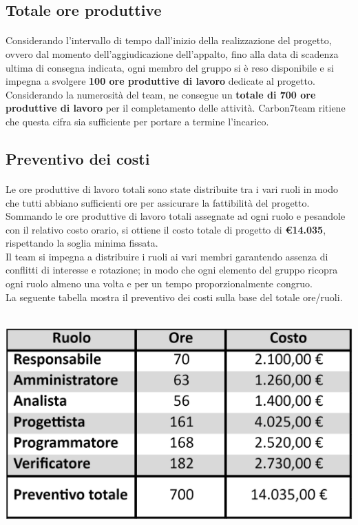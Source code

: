 \subsection{Totale ore produttive}
\paragraph{}
Considerando l’intervallo di tempo dall’inizio della realizzazione del
progetto, ovvero dal momento dell’aggiudicazione dell’appalto, fino alla
data di scadenza ultima di consegna indicata, ogni membro del gruppo si
è reso disponibile e si impegna a svolgere \textbf{100 ore produttive di lavoro}
dedicate al progetto. Considerando la numerosità del team, ne consegue un
\textbf{totale di 700 ore produttive di lavoro} per il completamento delle attività.
Carbon7team ritiene che questa cifra sia sufficiente per portare a termine
l’incarico.
\subsection{Preventivo dei costi}
\paragraph{}
Le ore produttive di lavoro totali sono state distribuite tra i vari ruoli
in modo che tutti abbiano sufficienti ore per assicurare la fattibilità del
progetto. Sommando le ore produttive di lavoro totali assegnate ad ogni ruolo
e pesandole con il relativo costo orario, si ottiene il costo totale di progetto
di \textbf{€14.035}, rispettando la soglia minima fissata.\\Il team si impegna a
distribuire i ruoli ai vari membri garantendo assenza di conflitti di interesse
e rotazione; in modo che ogni elemento del gruppo ricopra ogni ruolo almeno una
volta e per un tempo proporzionalmente congruo.\\La seguente tabella mostra il
preventivo dei costi sulla base del totale ore/ruoli.\\\\
\begin{center}
\includegraphics[scale=0.3]{res/images/tabella_costi.png}
\end{center}
\newpage

